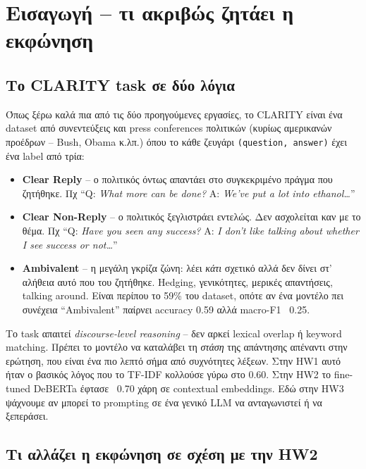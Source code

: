 \documentclass[12pt]{fphw}
\begin{document}
\section{Εισαγωγή -- τι ακριβώς ζητάει η εκφώνηση}

\subsection{Το CLARITY task σε δύο λόγια}

Όπως ξέρω καλά πια από τις δύο προηγούμενες εργασίες, το CLARITY είναι ένα dataset από συνεντεύξεις και press conferences πολιτικών (κυρίως αμερικανών προέδρων -- Bush, Obama κ.λπ.) όπου το κάθε ζευγάρι \texttt{(question, answer)} έχει ένα label από τρία:

\begin{itemize}
    \item \textbf{Clear Reply} -- ο πολιτικός όντως απαντάει στο συγκεκριμένο πράγμα που ζητήθηκε. Πχ ``Q: \emph{What more can be done?} A: \emph{We've put a lot into ethanol\dots}''
    \item \textbf{Clear Non-Reply} -- ο πολιτικός ξεγλιστράει εντελώς. Δεν ασχολείται καν με το θέμα. Πχ ``Q: \emph{Have you seen any success?} A: \emph{I don't like talking about whether I see success or not\dots}''
    \item \textbf{Ambivalent} -- η μεγάλη γκρίζα ζώνη: λέει \emph{κάτι} σχετικό αλλά δεν δίνει στ' αλήθεια αυτό που του ζητήθηκε. Hedging, γενικότητες, μερικές απαντήσεις, talking around. Είναι περίπου το 59\% του dataset, οπότε αν ένα μοντέλο πει συνέχεια ``Ambivalent'' παίρνει accuracy 0.59 αλλά macro-F1 ~0.25.
\end{itemize}

Το task απαιτεί \emph{discourse-level reasoning} -- δεν αρκεί lexical overlap ή keyword matching. Πρέπει το μοντέλο να καταλάβει τη \emph{στάση} της απάντησης απέναντι στην ερώτηση, που είναι ένα πιο λεπτό σήμα από συχνότητες λέξεων. Στην HW1 αυτό ήταν ο βασικός λόγος που το TF-IDF κολλούσε γύρω στο 0.60. Στην HW2 το fine-tuned DeBERTa έφτασε ~0.70 χάρη σε contextual embeddings. Εδώ στην HW3 ψάχνουμε αν μπορεί το prompting σε ένα γενικό LLM να ανταγωνιστεί ή να ξεπεράσει.

\subsection{Τι αλλάζει η εκφώνηση σε σχέση με την HW2}
\end{document}
